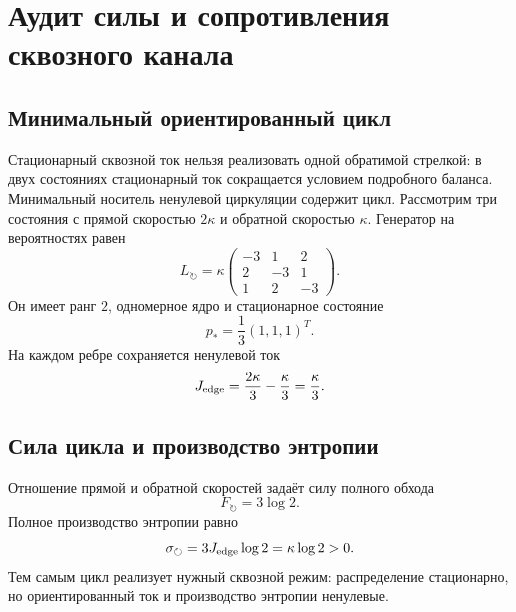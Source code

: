 \chapter{Аудит силы и сопротивления сквозного канала}
\label{ch:v10-throughflow-affinity-impedance-audit}

\section{Минимальный ориентированный цикл}

Стационарный сквозной ток нельзя реализовать одной обратимой стрелкой:
в двух состояниях стационарный ток сокращается условием подробного баланса.
Минимальный носитель ненулевой циркуляции содержит цикл. Рассмотрим три
состояния с прямой скоростью $2\kappa$ и обратной скоростью $\kappa$.
Генератор на вероятностях равен
\begin{equation}
 L_\circlearrowright=\kappa
 \begin{pmatrix}
 -3&1&2\\2&-3&1\\1&2&-3
 \end{pmatrix}.
 \label{eq:v10-throughflow-cycle-generator}
\end{equation}
Он имеет ранг $2$, одномерное ядро и стационарное состояние
\begin{equation}
 p_*=\frac13(1,1,1)^T.
\end{equation}
На каждом ребре сохраняется ненулевой ток
\begin{equation}
 J_{\rm edge}=\frac{2\kappa}{3}-\frac{\kappa}{3}=\frac{\kappa}{3}.
 \label{eq:v10-throughflow-cycle-current}
\end{equation}

\section{Сила цикла и производство энтропии}

Отношение прямой и обратной скоростей задаёт силу полного обхода
\begin{equation}
 F_\circlearrowright=3\log 2.
 \label{eq:v10-throughflow-cycle-affinity}
\end{equation}
Полное производство энтропии равно
\begin{equation}
 \sigma_\circlearrowright
 =3J_{\rm edge}\log2=\kappa\log2>0.
 \label{eq:v10-throughflow-cycle-entropy}
\end{equation}
Тем самым цикл реализует нужный сквозной режим: распределение стационарно,
но ориентированный ток и производство энтропии ненулевые.

